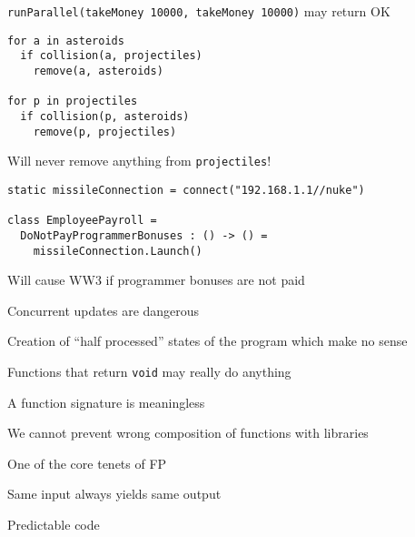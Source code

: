 \documentclass{beamer}
\begin{document}
\begin{slide}{
\item \texttt{runParallel(takeMoney 10000, takeMoney 10000)} may return OK
}\end{slide}

\begin{frame}[fragile]
\begin{lstlisting}
for a in asteroids
  if collision(a, projectiles)
    remove(a, asteroids)
  
for p in projectiles
  if collision(p, asteroids)
    remove(p, projectiles)
\end{lstlisting}
\end{frame}

\begin{slide}{
\item Will never remove anything from \texttt{projectiles}!
}\end{slide}

\begin{frame}[fragile]
\begin{lstlisting}
static missileConnection = connect("192.168.1.1//nuke")

class EmployeePayroll =
  DoNotPayProgrammerBonuses : () -> () =
    missileConnection.Launch()
\end{lstlisting}
\end{frame}

\begin{slide}{
\item Will cause WW3 if programmer bonuses are not paid
}\end{slide}

\begin{slide}{
\item Concurrent updates are dangerous
\item Creation of ``half processed'' states of the program which make no sense
}\end{slide}

\begin{slide}{
\item Functions that return \texttt{void} may really do anything
\item A function signature is meaningless
\item We cannot prevent wrong composition of functions with libraries
}\end{slide}


\begin{slide}{
\item One of the core tenets of FP
\item Same input always yields same output
\item Predictable code
}\end{slide}
\end{document}
